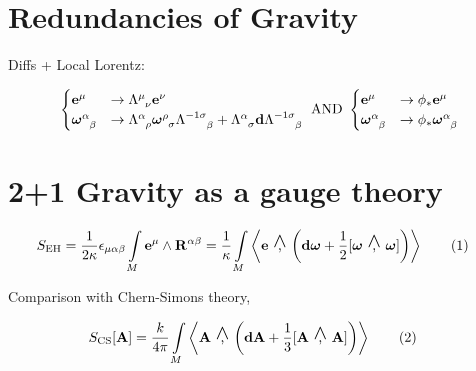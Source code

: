 \documentclass[a0,portrait]{a0poster}
\newcommand{\wedgecomma}{\stackon[1pt]{,}{\smash{\scriptsize$\wedge$}}}
\newcommand{\wedgecomm}[2]{\qty[ #1\ \wedgecomma\ #2 ]}
\newcommand\numberthis{\addtocounter{equation}{1}\tag{\theequation}}
\begin{document}
\begin{multicols}{2}
\section*{Redundancies of Gravity}

Diffs + Local Lorentz:

\begin{align}
    \begin{cases}
        \vb e^\mu&\rightarrow\tensor{\Lambda}{^\mu_\nu}\vb e^\nu\\
        \tensor{\boldsymbol\omega}{^\alpha_\beta}&\rightarrow\tensor{\Lambda}{^\alpha_\rho}\tensor{\boldsymbol\omega}{^\rho_\sigma}\tensor{\Lambda}{^{-1}^\sigma_\beta}+\tensor{\Lambda}{^\alpha_\sigma}\vb d\tensor{\Lambda}{^{-1}^\sigma_\beta}
    \end{cases} \textnormal{  AND  }
    \begin{cases}
        \vb e^\mu&\rightarrow\phi_\ast\vb e^\mu\\
        \tensor{\boldsymbol\omega}{^\alpha_\beta}&\rightarrow\phi_\ast\tensor{\boldsymbol\omega}{^\alpha_\beta}
    \end{cases} 
\end{align}

\section*{2+1 Gravity as a gauge theory}

\begin{align}
    S_{\textnormal{EH}}&=\frac{1}{2\kappa}\epsilon_{\mu\alpha\beta}\int\limits_M\vb e^\mu\wedge \vb R^{\alpha\beta}=\frac{1}{\kappa}\int\limits_M\expval{\vb e\ \wedgecomma\ \qty(\vb d{\boldsymbol\omega}+\frac12\wedgecomm{\boldsymbol\omega}{\boldsymbol\omega})}\numberthis\label{EHAction4}
\end{align}

Comparison with Chern-Simons theory,

\begin{align}
    S_{\textnormal{CS}}\qty[\vb A]&=\frac{k}{4\pi}\int\limits_M\expval{\vb A\ \wedgecomma\ \qty(\vb d{\vb A}+\frac13\wedgecomm{\vb A}{\vb A})}\numberthis\label{YangMillsAction}
\end{align}


\end{multicols}
\end{document}
